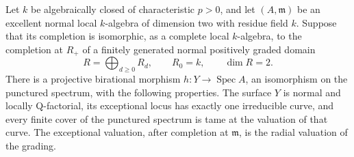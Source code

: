 \begin{proposition}
\label{D:weighted-graded-extraction}
Let $k$ be algebraically closed of characteristic $p>0$, and let
$(A,\mathfrak m)$ be an excellent normal local $k$-algebra of
dimension two with residue field $k$.  Suppose that its completion
is isomorphic, as a complete local $k$-algebra, to the completion
at $R_+$ of a finitely generated normal positively graded domain
\[
 R=\bigoplus_{d\geq0}R_d,\qquad R_0=k,\qquad \dim R=2.
\]
There is a projective birational morphism
$h:Y\to\operatorname{Spec}A$, an isomorphism on the punctured
spectrum, with the following properties.  The surface $Y$ is
normal and locally Q-factorial, its exceptional locus has exactly
one irreducible curve, and every finite cover of the punctured
spectrum is tame at the valuation of that curve.  The exceptional
valuation, after completion at $\mathfrak m$, is the radial
valuation of the grading.
\end{proposition}
